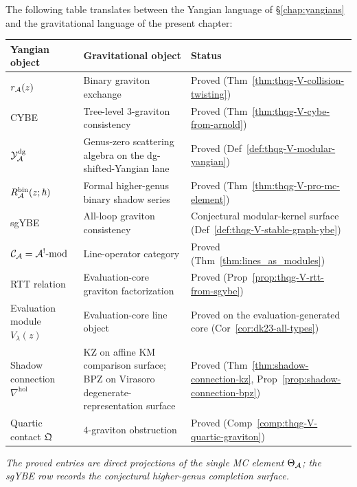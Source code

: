 \begin{remark}
\label{rem:thqg-V-dictionary}
The following table translates between the Yangian language of
\S\ref{chap:yangians} and the gravitational language of the present
chapter:

\begin{center}
\renewcommand{\arraystretch}{1.3}
\small
\begin{tabular}{@{}lll@{}}
\toprule
\textbf{Yangian object} & \textbf{Gravitational object}
 & \textbf{Status} \\
\midrule
$r_{\mathcal{A}}(z)$ & Binary graviton exchange
 & Proved (Thm~\ref{thm:thqg-V-collision-twisting}) \\
CYBE & Tree-level $3$-graviton consistency
 & Proved (Thm~\ref{thm:thqg-V-cybe-from-arnold}) \\
$\mathcal{Y}^{\mathrm{dg}}_{\mathcal{A}}$ & Genus-zero scattering algebra on the dg-shifted-Yangian lane
 & Proved (Def~\ref{def:thqg-V-modular-yangian}) \\
$R^{\mathrm{bin}}_{\mathcal{A}}(z;\hbar)$ & Formal higher-genus binary shadow series
 & Proved (Thm~\ref{thm:thqg-V-pro-mc-element}) \\
sgYBE & All-loop graviton consistency
 & Conjectural modular-kernel surface
 (Def~\ref{def:thqg-V-stable-graph-ybe}) \\
$\mathcal{C}_{\mathcal{A}} = \mathcal{A}^!\text{-mod}$ & Line-operator category
 & Proved (Thm~\ref{thm:lines_as_modules}) \\
RTT relation & Evaluation-core graviton factorization
 & Proved (Prop~\ref{prop:thqg-V-rtt-from-sgybe}) \\
Evaluation module $V_\lambda(z)$ & Evaluation-core line object
 & Proved on the evaluation-generated core
 (Cor~\ref{cor:dk23-all-types}) \\
Shadow connection $\nabla^{\mathrm{hol}}$
 & KZ on affine KM comparison surface; BPZ on Virasoro
 degenerate-representation surface
 & Proved (Thm~\ref{thm:shadow-connection-kz},
 Prop~\ref{prop:shadow-connection-bpz}) \\
Quartic contact $\mathfrak{Q}$ & $4$-graviton obstruction
 & Proved (Comp~\ref{comp:thqg-V-quartic-graviton}) \\
\bottomrule
\end{tabular}
\end{center}
\emph{The proved entries are direct projections of the single MC
element $\Theta_{\mathcal{A}}$; the sgYBE row records the conjectural
higher-genus completion surface.}
\end{remark}


